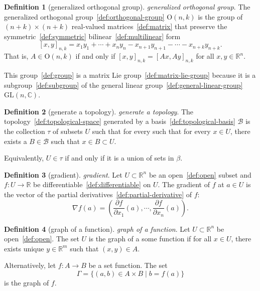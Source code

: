 \documentclass[12pt,a4paper]{article}
\theoremstyle{definition}
\newtheorem{definition}{Definition}
\begin{document}
\begin{definition}[generalized orthogonal group]\label{def:generalized-orthogonal-group}
\emph{generalized orthogonal group}. The generalized orthogonal group~\ref{def:orthogonal-group} $\text{O}(n,k)$ is the group of $(n+k)\times (n+k)$ real-valued matrices~\ref{def:matrix} that preserve the symmetric~\ref{def:symmetric} bilinear~\ref{def:multilinear} form $$[x,y]_{n,k} = x_1y_1 + \cdots + x_ny_n - x_{n+1}y_{n+1} - \cdots - x_{n+k}y_{n+k}.$$That is, $A \in \text{O}(n,k)$ if and only if $[x,y]_{n,k} = [Ax,Ay]_{n,k}$ for all $x,y \in \mathbb R^n$. 

This group~\ref{def:group} is a matrix Lie group~\ref{def:matrix-lie-group} because it is a subgroup~\ref{def:subgroup} of the general linear group~\ref{def:general-linear-group} $\text{GL}(n,\mathbb C)$.
\end{definition}

\begin{definition}[generate a topology]\label{def:generate-a-topology}
\emph{generate a topology}. The topology~\ref{def:topological-space} generated  by a basis~\ref{def:topological-basis} $\mathcal B$ is the collection $\tau$ of subsets $U$ such that for every such that for every $x\in U$, there exists a $B\in \mathcal B$ such that $x\in B\subset U$.

Equivalently, $U\in \tau$ if and only if it is a union of sets in $\beta$.
\end{definition}

\begin{definition}[gradient]\label{def:gradient}
\emph{gradient}. Let $U\subset\mathbb R^n$ be an open~\ref{def:open} subset and $f:U\to \mathbb R$ be differentiable~\ref{def:differentiable} on $U$. The gradient of $f$ at $a \in U$ is the vector of the partial derivatives~\ref{def:partial-derivative} of $f$: $$\nabla f(a) = \left(\frac{\partial f}{\partial x_1}(a),\cdots, \frac{\partial f}{\partial x_n}(a) \right).$$
\end{definition}

\begin{definition}[graph of a function]\label{def:graph-of-a-function}
\emph{graph of a function}. Let $U \subset \mathbb R^n$ be open~\ref{def:open}. The set $U$ is the graph of a some function if for all $x \in U$, there exists unique $y \in \mathbb R^m$ such that $(x,y) \in A$.

Alternatively, let $f:A\to B$ be a set function. The set $$\Gamma = \{(a,b) \in A\times B \mid b=f(a)\}$$ is the graph of $f$.
\end{definition}
\end{document}
